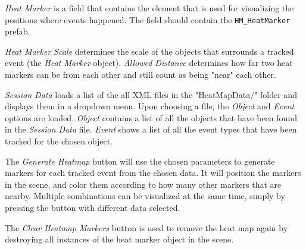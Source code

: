 \textit{Heat Marker} is a field that contains the element that is used for visualizing the positions where events happened. The field should contain the \texttt{HM\_HeatMarker} prefab.

\textit{Heat Marker Scale} determines the scale of the objects that surrounds a tracked event (the \textit{Heat Marker} object). \textit{Allowed Distance} determines how far two heat markers can be from each other and still count as being "near" each other.

\textit{Session Data} loads a list of the all XML files in the "HeatMapData/" folder and displays them in a dropdown menu. Upon choosing a file, the \textit{Object} and \textit{Event} options are loaded. \textit{Object} contains a list of all the objects that have been found in the \textit{Session Data} file. \textit{Event} shows a list of all the event types that have been tracked for the chosen object.

The \textit{Generate Heatmap} button will use the chosen parameters to generate markers for each tracked event from the chosen data. It will position the markers in the scene, and color them according to how many other markers that are nearby. Multiple combinations can be visualized at the same time, simply by pressing the button with different data selected.

The \textit{Clear Heatmap Markers} button is used to remove the heat map again by destroying all instances of the heat marker object in the scene.